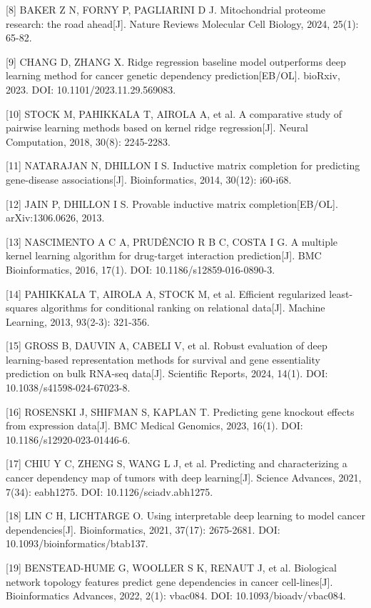 {[}8{]} BAKER Z N, FORNY P, PAGLIARINI D J. Mitochondrial proteome research: the road ahead{[}J{]}. Nature Reviews Molecular Cell Biology, 2024, 25(1): 65-82.

{[}9{]} CHANG D, ZHANG X. Ridge regression baseline model outperforms deep learning method for cancer genetic dependency prediction{[}EB/OL{]}. bioRxiv, 2023. DOI: 10.1101/2023.11.29.569083.

{[}10{]} STOCK M, PAHIKKALA T, AIROLA A, et al. A comparative study of pairwise learning methods based on kernel ridge regression{[}J{]}. Neural Computation, 2018, 30(8): 2245-2283.

{[}11{]} NATARAJAN N, DHILLON I S. Inductive matrix completion for predicting gene-disease associations{[}J{]}. Bioinformatics, 2014, 30(12): i60-i68.

{[}12{]} JAIN P, DHILLON I S. Provable inductive matrix completion{[}EB/OL{]}. arXiv:1306.0626, 2013.

{[}13{]} NASCIMENTO A C A, PRUDÊNCIO R B C, COSTA I G. A multiple kernel learning algorithm for drug-target interaction prediction{[}J{]}. BMC Bioinformatics, 2016, 17(1). DOI: 10.1186/s12859-016-0890-3.

{[}14{]} PAHIKKALA T, AIROLA A, STOCK M, et al. Efficient regularized least-squares algorithms for conditional ranking on relational data{[}J{]}. Machine Learning, 2013, 93(2-3): 321-356.

{[}15{]} GROSS B, DAUVIN A, CABELI V, et al. Robust evaluation of deep learning-based representation methods for survival and gene essentiality prediction on bulk RNA-seq data{[}J{]}. Scientific Reports, 2024, 14(1). DOI: 10.1038/s41598-024-67023-8.

{[}16{]} ROSENSKI J, SHIFMAN S, KAPLAN T. Predicting gene knockout effects from expression data{[}J{]}. BMC Medical Genomics, 2023, 16(1). DOI: 10.1186/s12920-023-01446-6.

{[}17{]} CHIU Y C, ZHENG S, WANG L J, et al. Predicting and characterizing a cancer dependency map of tumors with deep learning{[}J{]}. Science Advances, 2021, 7(34): eabh1275. DOI: 10.1126/sciadv.abh1275.

{[}18{]} LIN C H, LICHTARGE O. Using interpretable deep learning to model cancer dependencies{[}J{]}. Bioinformatics, 2021, 37(17): 2675-2681. DOI: 10.1093/bioinformatics/btab137.

{[}19{]} BENSTEAD-HUME G, WOOLLER S K, RENAUT J, et al. Biological network topology features predict gene dependencies in cancer cell-lines{[}J{]}. Bioinformatics Advances, 2022, 2(1): vbac084. DOI: 10.1093/bioadv/vbac084.
\fi

